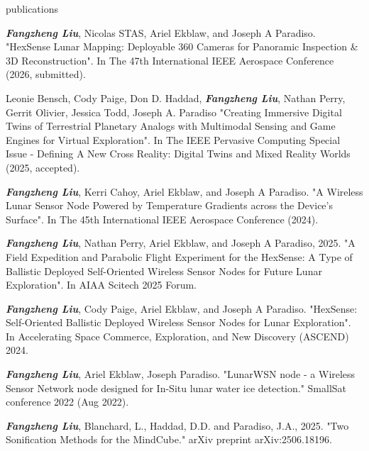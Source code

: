 \documentclass{resume} %
\begin{document}
\begin{rSection}{publications}
\begin{itemlabel}
\item \textbf{\textit{Fangzheng Liu}}, Nicolas STAS, Ariel Ekblaw, and Joseph A Paradiso.
"HexSense Lunar Mapping: Deployable 360 Cameras for Panoramic Inspection \& 3D Reconstruction".
In The 47th International IEEE Aerospace Conference (2026, submitted).
\smallskip
\smallskip

\item Leonie Bensch, Cody Paige, Don D. Haddad, \textbf{\textit{Fangzheng Liu}},
Nathan Perry, Gerrit Olivier, Jessica Todd, Joseph A. Paradiso
"Creating Immersive Digital Twins of Terrestrial Planetary Analogs with Multimodal Sensing and Game Engines for Virtual Exploration".
In The IEEE Pervasive Computing Special Issue - Defining A New Cross Reality: Digital Twins and Mixed Reality Worlds (2025, accepted).
\smallskip
\smallskip

\item \textbf{\textit{Fangzheng Liu}}, Kerri Cahoy, Ariel Ekblaw, and Joseph A Paradiso.
"A Wireless Lunar Sensor Node Powered by Temperature Gradients across the Device's Surface".
In The 45th International IEEE Aerospace Conference (2024).
\smallskip
\smallskip

\item \textbf{\textit{Fangzheng Liu}}, Nathan Perry, Ariel Ekblaw, and Joseph A Paradiso, 2025.
"A Field Expedition and Parabolic Flight Experiment for the HexSense: A Type of Ballistic
Deployed Self-Oriented Wireless Sensor Nodes for Future Lunar Exploration".
In AIAA Scitech 2025 Forum.
\smallskip
\smallskip

\item \textbf{\textit{Fangzheng Liu}},
Cody Paige, Ariel Ekblaw, and Joseph A Paradiso.
"HexSense: Self-Oriented Ballistic Deployed Wireless Sensor Nodes for Lunar Exploration".
In Accelerating Space Commerce, Exploration, and New Discovery (ASCEND) 2024.
\smallskip
\smallskip

\item \textbf{\textit{Fangzheng Liu}}, Ariel Ekblaw, Joseph Paradiso.
"LunarWSN node - a Wireless Sensor Network node designed for In-Situ lunar water ice detection."
SmallSat conference 2022 (Aug 2022).
\smallskip
\smallskip

\item \textbf{\textit{Fangzheng Liu}}, Blanchard, L., Haddad, D.D. and Paradiso, J.A., 2025.
"Two Sonification Methods for the MindCube." arXiv preprint arXiv:2506.18196.
\smallskip
\smallskip


\end{itemlabel}
\end{rSection}
\end{document}
